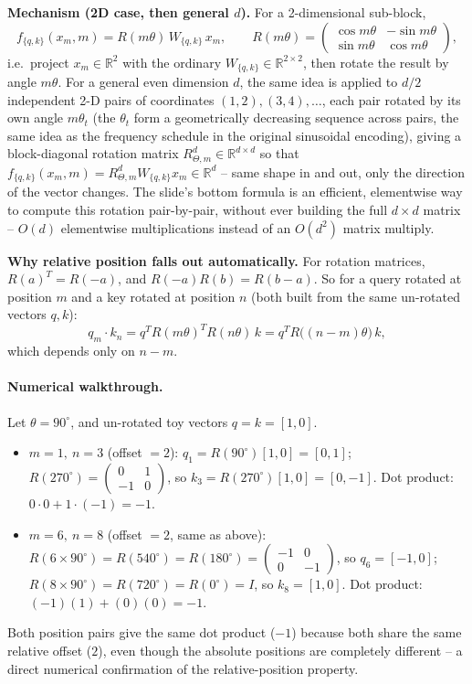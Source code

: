 \documentclass[11pt]{article}
\begin{document}
\textbf{Mechanism (2D case, then general $d$).} For a 2-dimensional sub-block,
\[
f_{\{q,k\}}(x_m,m) = R(m\theta)\,W_{\{q,k\}}\,x_m, \qquad R(m\theta)=\begin{pmatrix}\cos m\theta & -\sin m\theta\\ \sin m\theta & \cos m\theta\end{pmatrix},
\]
i.e.\ project $x_m\in\mathbb{R}^2$ with the ordinary $W_{\{q,k\}}\in\mathbb{R}^{2\times2}$, then rotate the result by angle $m\theta$. For a general even dimension $d$, the same idea is applied to $d/2$ independent 2-D pairs of coordinates $(1,2),(3,4),\dots$, each pair rotated by its own angle $m\theta_t$ (the $\theta_t$ form a geometrically decreasing sequence across pairs, the same idea as the frequency schedule in the original sinusoidal encoding), giving a block-diagonal rotation matrix $R^d_{\Theta,m}\in\mathbb{R}^{d\times d}$ so that $f_{\{q,k\}}(x_m,m)=R^d_{\Theta,m}W_{\{q,k\}}x_m \in \mathbb{R}^d$ -- same shape in and out, only the direction of the vector changes. The slide's bottom formula is an efficient, elementwise way to compute this rotation pair-by-pair, without ever building the full $d\times d$ matrix -- $O(d)$ elementwise multiplications instead of an $O(d^2)$ matrix multiply.

\textbf{Why relative position falls out automatically.} For rotation matrices, $R(a)^T = R(-a)$, and $R(-a)R(b)=R(b-a)$. So for a query rotated at position $m$ and a key rotated at position $n$ (both built from the same un-rotated vectors $q,k$):
\[
q_m \cdot k_n = q^T R(m\theta)^T R(n\theta)\, k = q^T R\big((n-m)\theta\big)\,k,
\]
which depends only on $n-m$.

\paragraph{Numerical walkthrough.} Let $\theta = 90^\circ$, and un-rotated toy vectors $q=k=[1,0]$.
\begin{itemize}
\item $m=1,\ n=3$ (offset $=2$): $q_1 = R(90^\circ)[1,0]=[0,1]$; $R(270^\circ)=\begin{pmatrix}0&1\\-1&0\end{pmatrix}$, so $k_3=R(270^\circ)[1,0]=[0,-1]$. Dot product: $0\cdot0+1\cdot(-1)=-1$.
\item $m=6,\ n=8$ (offset $=2$, same as above): $R(6\times90^\circ)=R(540^\circ)=R(180^\circ)=\begin{pmatrix}-1&0\\0&-1\end{pmatrix}$, so $q_6=[-1,0]$; $R(8\times90^\circ)=R(720^\circ)=R(0^\circ)=I$, so $k_8=[1,0]$. Dot product: $(-1)(1)+(0)(0)=-1$.
\end{itemize}
Both position pairs give the same dot product ($-1$) because both share the same relative offset ($2$), even though the absolute positions are completely different -- a direct numerical confirmation of the relative-position property.
\end{document}
